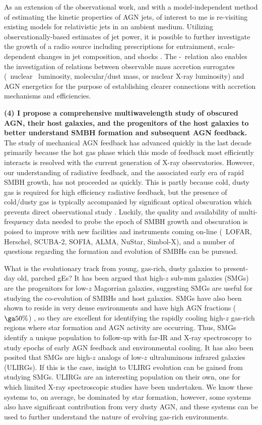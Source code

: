 \documentclass[11pt]{article}
\begin{document}
As an extension of the observational work, and with a
model-independent method of estimating the kinetic properties of AGN
jets, of interest to me is re-visiting existing models for
relativistic jets in an ambient medium. Utilizing
observationally-based estimates of jet power, it is possible to
further investigate the growth of a radio source including
prescriptions for entrainment, scale-dependent changes in jet
composition, and shocks \cite[\'a la][]{1999MNRAS.309.1017W}. The
\pjet-\lrad\ relation also enables the investigation of relations
between observable mass accretion surrogates (\ie\ nuclear \halpha\
luminosity, molecular/dust mass, or nuclear X-ray luminosity) and AGN
energetics for the purpose of establishing clearer connections with
accretion mechanisms and efficiencies.

{\bf{(4) I propose a comprehensive multiwavelength study of obscured
AGN, their host galaxies, and the progenitors of the host galaxies to
better understand SMBH formation and subsequent AGN feedback.}} The
study of mechanical AGN feedback has advanced quickly in the last
decade primarily because the hot gas phase which this mode of feedback
most efficiently interacts is resolved with the current generation of
X-ray observatories. However, our understanding of radiative feedback,
and the associated early era of rapid SMBH growth, has not proceeded
as quickly. This is partly because cold, dusty gas is required for
high efficiency radiative feedback, but the presence of cold/dusty gas
is typically accompanied by significant optical obscuration which
prevents direct observational study
\cite{2009arXiv0911.3911A}. Luckily, the quality and availability of
multi-frequency data needed to probe the epoch of SMBH growth and
obscuration is poised to improve with new facilities and instruments
coming on-line (\ie\ LOFAR, Herschel, SCUBA-2, SOFIA, ALMA, NuStar,
Simbol-X), and a number of questions regarding the formation and
evolution of SMBHs can be pursued.

What is the evolutionary track from young, gas-rich, dusty galaxies to
present-day old, parched gEs? It has been argued that high-$z$ sub-mm
galaxies (SMGs) are the progenitors for low-$z$ Magorrian galaxies,
suggesting SMGs are useful for studying the co-evolution of SMBHs and
host galaxies. SMGs have also been shown to reside in very dense
environments and have high AGN fractions ($\ga 50\%$)
\cite{2005ApJ...632..736A}, so they are excellent for identifying the
rapidly cooling high-$z$ gas-rich regions where star formation and AGN
activity are occurring. Thus, SMGs identify a unique population to
follow-up with far-IR and X-ray spectroscopy to study epochs of early
AGN feedback and environmental cooling. It has also been posited that
SMGs are high-$z$ analogs of low-$z$ ultraluminous infrared galaxies
(ULIRGs). If this is the case, insight to ULIRG evolution can be
gained from studying SMGs. ULIRGs are an interesting population on
their own, one for which limited X-ray spectroscopic studies have been
undertaken. We know these systems to, on average, be dominated by star
formation, however, some systems also have significant contribution
from very dusty AGN, and these systems can be used to further
understand the nature of evolving gas-rich environments.
\end{document}
